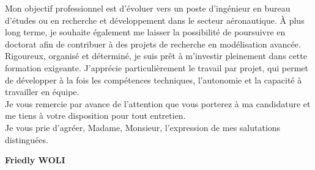 \documentclass[11pt,a4paper]{article}
\begin{document}
	Mon objectif professionnel est d’évoluer vers un poste d’ingénieur en bureau d’études ou en recherche et développement dans le secteur aéronautique. À plus long terme, je souhaite également me laisser la possibilité de poursuivre en doctorat afin de contribuer à des projets de recherche en modélisation avancée.\\
	
	Rigoureux, organisé et déterminé, je suis prêt à m’investir pleinement dans cette formation exigeante. J’apprécie particulièrement le travail par projet, qui permet de développer à la fois les compétences techniques, l’autonomie et la capacité à travailler en équipe.\\
	
	Je vous remercie par avance de l’attention que vous porterez à ma candidature et me tiens à votre disposition pour tout entretien.\\
	
	Je vous prie d’agréer, Madame, Monsieur, l’expression de mes salutations distinguées.
	
	
	
	\vspace{0.8cm}
	
	
	
	
	
	
	\begin{flushright}
		
		\textbf{Friedly WOLI}
	\end{flushright}
	
	
\end{document}
